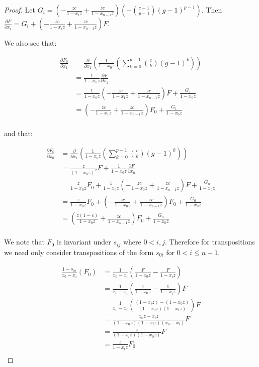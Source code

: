 \documentclass{article}
\numberwithin{equation}{section}
\begin{document}
\begin{proof}
Let $G_i=\left(-\frac{zc}{1-x_iz}+\frac{zc}{1-x_{n-1}z}\right)\left(-\binom{c-1}{p-1}(g-1)^{p-1}\right)$. Then $\frac{\partial F}{\partial x_i}=G_i+\left(-\frac{zc}{1-x_iz}+\frac{zc}{1-x_{n-1}z}\right)F$.

We also see that:

\begin{align*}
\frac{\partial F_0}{\partial x_1}&=\frac{\partial}{\partial x_1}\left(\frac{1}{1-x_0z}\left(\sum_{k=0}^{p-1} \binom{c}{k} (g-1)^k\right)\right)\\
&=\frac{1}{1-x_0z}\frac{\partial F}{\partial x_1}\\
&=\frac{1}{1-x_0z}\left(-\frac{zc}{1-x_1z}+\frac{zc}{1-x_{n-1}z}\right)F+\frac{G_1}{1-x_0z}\\
&=\left(-\frac{zc}{1-x_1z}+\frac{zc}{1-x_{n-1}z}\right)F_0+\frac{G_1}{1-x_0z}\\
\end{align*}

and that:

\begin{align*}
\frac{\partial F_0}{\partial x_0}&=\frac{\partial}{\partial x_1}\left(\frac{1}{1-x_0z}\left(\sum_{k=0}^{p-1} \binom{c}{k} (g-1)^k\right)\right)\\
&=\frac{z}{(1-x_0z)^2}F+\frac{1}{1-x_0z}\frac{\partial F}{\partial x_0}\\
&=\frac{z}{1-x_0z}F_0+\frac{1}{1-x_0z}\left(-\frac{zc}{1-x_0z}+\frac{zc}{1-x_{n-1}z}\right)F+\frac{G_0}{1-x_0z}\\
&=\frac{z}{1-x_0z}F_0+\left(-\frac{zc}{1-x_0z}+\frac{zc}{1-x_{n-1}z}\right)F_0+\frac{G_0}{1-x_0z}\\
&=\left(\frac{z(1-c)}{1-x_0z}+\frac{zc}{1-x_{n-1}z}\right)F_0+\frac{G_0}{1-x_0z}\\
\end{align*}

We note that $F_0$ is invariant under $s_{ij}$ where $0 < i,j$. Therefore for transpositions we need only consider transpositions of the form $s_{0i}$ for $0 < i \le n-1$. 

\begin{align*}
\frac{1-s_{0i}}{x_0-x_i}(F_0)&=\frac{1}{x_0-x_i}\left(\frac{F}{1-x_0z}-\frac{F}{1-x_iz}\right)\\
&=\frac{1}{x_0-x_i}\left(\frac{1}{1-x_0z}-\frac{1}{1-x_iz}\right)F\\
&=\frac{1}{x_0-x_i}\left(\frac{(1-x_iz)-(1-x_0z)}{(1-x_0z)(1-x_iz)}\right)F\\
&=\frac{x_0z-x_iz}{(1-x_0z)(1-x_iz)(x_0-x_i)}F\\
&=\frac{z}{(1-x_iz)(1-x_0z)}F\\
&=\frac{z}{1-x_iz}F_0\\
\end{align*}



\end{proof}
\end{document}
